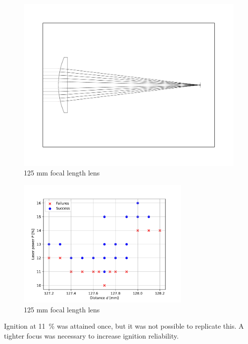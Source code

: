             \begin{figure}[h]
                \centering
                \includegraphics[width=\textwidth]{assets/4 experiments/125lens.pdf}
                \caption{125 mm focal length lens}
            \end{figure}

            \begin{figure}[h]
                \centering
                \includegraphics[width=0.75\textwidth]{assets/4 experiments/125mm_focus_threshold.pdf}
                \caption{125 mm focal length lens}
            \end{figure}
            
            Ignition at \qty{11}{\%} was attained once, but it was not possible to replicate this. A tighter focus was necessary to increase ignition reliability.

